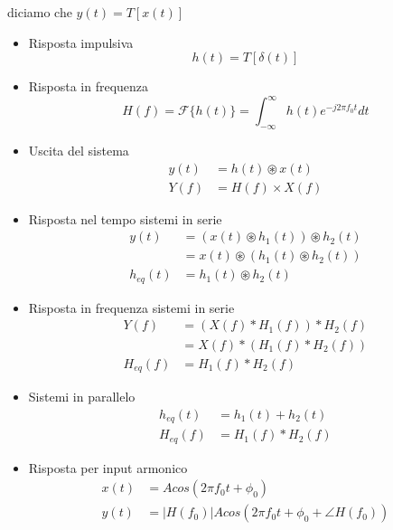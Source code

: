 \documentclass{article}
\begin{document}
diciamo che $y(t) = T[x(t)]$
\begin{itemize}

\item Risposta impulsiva \begin{equation*}
  h(t) = T[\delta (t)]
\end{equation*}

\item Risposta in frequenza \begin{equation*}
  H(f) = \mathcal{F}\{h(t)\} = \int_{-\infty}^{\infty} h(t) e^{-j2\pi f_0 t} dt
\end{equation*}

\item Uscita del sistema \begin{align*}
  y(t) &= h(t) \circledast x(t)\\
  Y(f) &= H(f) \times X(f)
\end{align*}

\item Risposta nel tempo sistemi in serie\begin{align*}
  y(t) &= (x(t) \circledast h_1(t)) \circledast h_2(t)\\
       &= x(t) \circledast (h_1(t) \circledast h_2(t))\\
  h_{eq}(t)&= h_1(t) \circledast h_2(t)
\end{align*}

\item Risposta in frequenza sistemi in serie \begin{align*}
  Y(f) &= (X(f) * H_1(f)) * H_2(f)\\
       &= X(f) * (H_1(f) * H_2(f))\\
  H_{eq}(f) &= H_1(f) * H_2(f)
\end{align*}

\item Sistemi in parallelo \begin{align*}
  h_{eq}(t) &= h_1(t) + h_2(t)\\
  H_{eq}(f) &= H_1(f) * H_2(f)
\end{align*}

\item Risposta per input armonico \begin{align*}
  x(t) &= A cos(2\pi f_0 t + \phi _0)\\
  y(t) &= \lvert H(f_0) \rvert A cos(2\pi f_0 t + \phi _0 + \angle H(f_0))
\end{align*}

\end{itemize}
\end{document}
